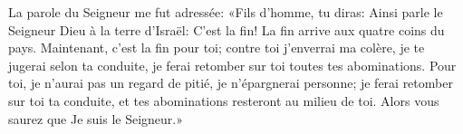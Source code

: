 La parole du Seigneur me fut adressée:
	«Fils d’homme, tu diras: Ainsi parle le Seigneur Dieu à la terre d’Israël:
	C’est la fin! La fin arrive aux quatre coins du pays.
Maintenant, c’est la fin pour toi; contre toi j’enverrai ma colère,
	je te jugerai selon ta conduite, je ferai retomber sur toi toutes tes abominations.
Pour toi, je n’aurai pas un regard de pitié, je n’épargnerai personne;
	je ferai retomber sur toi ta conduite,
	et tes abominations resteront au milieu de toi.
Alors vous saurez que Je suis le Seigneur.»
